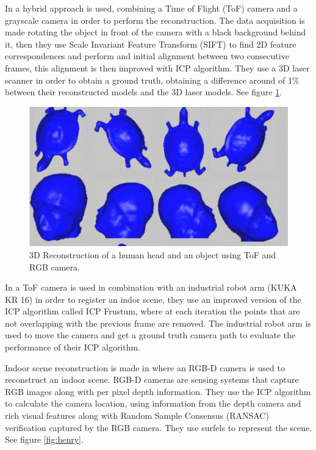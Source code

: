 In \cite{guangyu} a hybrid approach is used, combining a Time of Flight (ToF) camera and a grayscale camera in order to perform the reconstruction. 
The data acquisition is made rotating the object in front of the camera with a black background behind it, then they use 
Scale Invariant Feature Transform (SIFT) to find 2D feature correspondences and perform and initial alignment between two consecutive frames, this alignment is 
then improved with ICP algorithm. They use a 3D laser scanner in order to obtain a ground truth, obtaining a difference around of 1\% 
between their reconstructed
 models and the 3D laser models. See figure \ref{fig:guangyu}.




\begin{figure}[h!]
\begin{center}
\includegraphics[scale=0.38]{images/guangyu}
\caption{3D Reconstruction of a human head and an object using ToF and RGB camera.}
\label{fig:guangyu}
\end{center}
\end{figure}

In \cite{may2009} a ToF camera is used in combination with an industrial robot arm (KUKA KR 16) in order to register an indor scene,
they use an improved version of the ICP algorithm called ICP Frustum, where at each iteration the points that are not overlapping with the previous frame are removed. The industrial robot arm is used to move the camera and get a ground truth camera path to evaluate the performance of their ICP algorithm. 



 Indoor scene reconstruction is made in \cite{henry} where an RGB-D camera is used to reconstruct an indoor scene. RGB-D cameras are sensing systems that capture RGB images
 along with per pixel depth information. They use the ICP algorithm to calculate the camera location, using information from 
the depth camera and  rich visual
 features along with Random Sample Consensus (RANSAC) verification captured by the RGB camera. They use surfels \cite{pfister} to represent the scene. See figure \ref{fig:henry}.

